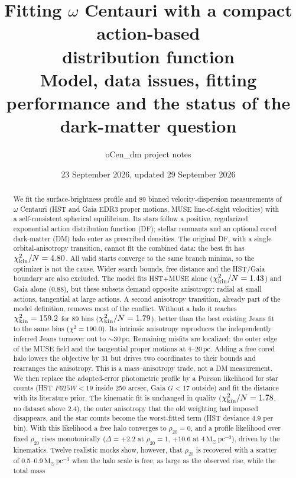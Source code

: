 \documentclass[11pt,a4paper]{article}
\title{\vspace{-1cm}Fitting $\omega$ Centauri with a compact action-based\\
distribution function\\[6pt]
\large Model, data issues, fitting performance and the status of the dark-matter question}
\author{oCen\_dm project notes}
\date{23 September 2026, updated 29 September 2026}
\newcommand{\Msun}{\ensuremath{\mathrm{M}_\odot}\xspace}
\newcommand{\pc}{\ensuremath{\,\mathrm{pc}}\xspace}
\newcommand{\chikin}{\ensuremath{\chi^2_{\rm kin}}\xspace}
\begin{document}
\maketitle

\begin{abstract}
We fit the surface-brightness profile and 89 binned velocity-dispersion
measurements of $\omega$ Centauri (HST and Gaia EDR3 proper motions, MUSE
line-of-sight velocities) with a self-consistent spherical equilibrium. Its
stars follow a positive, regularized exponential action distribution
function (DF); stellar remnants and an optional cored dark-matter (DM) halo
enter as prescribed densities. The original DF, with a single orbital-anisotropy
transition, cannot fit the combined data: the best fit has $\chikin/N=4.80$.
All valid starts converge to the same branch minima, so the optimizer is not
the cause. Wider search bounds, free distance and the HST/Gaia boundary are
also excluded. The model fits HST+MUSE alone ($\chikin/N=1.43$) and Gaia alone
(0.88), but these subsets demand opposite anisotropy: radial at small actions,
tangential at large actions. A second anisotropy transition, already part of
the model definition, removes most of the conflict. Without a halo it reaches
$\chikin=159.2$ for 89 bins ($\chikin/N=1.79$), better than the best existing
Jeans fit to the same bins ($\chi^2=190.0$). Its intrinsic anisotropy
reproduces the independently inferred Jeans turnover out to $\sim30\pc$.
Remaining misfits are localized: the outer edge of the MUSE field and the
tangential proper motions at 4--20\pc. Adding a free cored halo lowers the
objective by 31 but drives two coordinates to their bounds and rearranges the
anisotropy. This is a mass--anisotropy trade, not a DM measurement. We then replace the
adopted-error photometric profile by a Poisson likelihood for star counts
(HST $F625W<19$ inside 250 arcsec, Gaia $G<17$ outside) and fit the distance
with its literature prior. The kinematic fit is unchanged in quality
($\chikin/N=1.78$, no dataset above 2.4), the outer anisotropy that the old
weighting had imposed disappears, and the star counts become the
worst-fitted term (HST deviance 4.9 per bin). With this likelihood a free
halo converges to $\rho_{20}=0$, and a profile likelihood over fixed
$\rho_{20}$ rises monotonically ($\Delta=+2.2$ at $\rho_{20}=1$, $+10.6$ at
4\,$\Msun\pc^{-3}$), driven by the kinematics. Twelve realistic mocks show, however, that
$\rho_{20}$ is recovered with a scatter of 0.5--0.9\,$\Msun\pc^{-3}$ when the
halo scale is free, as large as the observed rise, while the total mass

\end{abstract}
\end{document}

